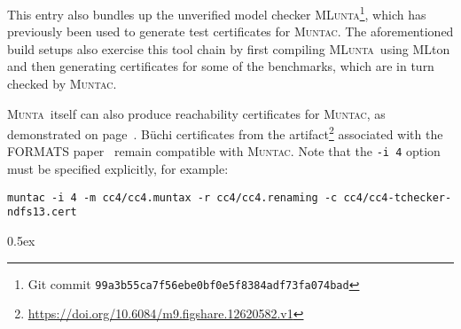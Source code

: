\documentclass[10pt,a4paper]{article}
\newcommand{\munta}{\textsc{Munta}}
\newcommand{\muntac}{\textsc{Muntac}}
\newcommand{\mlunta}{\textsc{MLunta}}
\begin{document}
This entry also bundles up the unverified model checker
\mlunta\footnote{Git commit \texttt{99a3b55ca7f56ebe0bf0e5f8384adf73fa074bad}},
which has previously been used to generate test certificates for \muntac.
The aforementioned build setups also exercise this tool chain by first compiling \mlunta\ using
MLton and then generating certificates for some of the benchmarks,
which are in turn checked by \muntac.

\munta\ itself can also produce reachability certificates for \muntac, as
demonstrated on page~\pageref{self-check}.
B\"uchi certificates from the
artifact\footnote{\url{https://doi.org/10.6084/m9.figshare.12620582.v1}}
associated with the FORMATS paper~\cite{muntac-formats} remain compatible with \muntac.
Note that the \texttt{-i 4} option must be specified explicitly, for example:
\begin{verbatim}
muntac -i 4 -m cc4/cc4.muntax -r cc4/cc4.renaming -c cc4/cc4-tchecker-ndfs13.cert
\end{verbatim}

\newpage

\parindent 0pt\parskip 0.5ex





\end{document}
